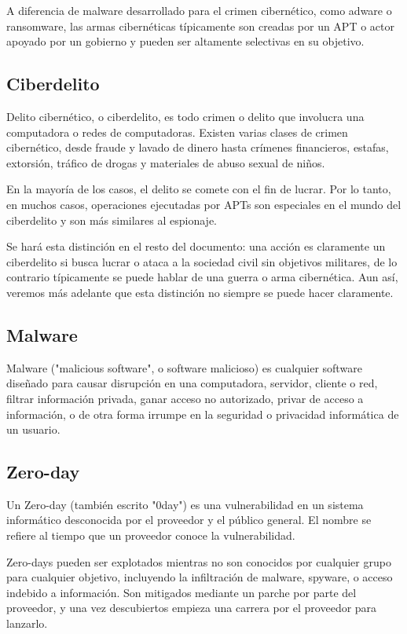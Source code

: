 \documentclass{article}
\begin{document}
A diferencia de malware desarrollado para el crimen cibernético, como adware o ransomware, las armas cibernéticas típicamente son creadas por un APT o actor apoyado por un gobierno y pueden ser altamente selectivas en su objetivo. \autocite{stevens-cyberweapons}

\subsection{Ciberdelito}
Delito cibernético, o ciberdelito, es todo crimen o delito que involucra una computadora o redes de computadoras. Existen varias clases de crimen cibernético, desde fraude y lavado de dinero hasta crímenes financieros, estafas, extorsión, tráfico de drogas y materiales de abuso sexual de niños.

En la mayoría de los casos, el delito se comete con el fin de lucrar. Por lo tanto, en muchos casos, operaciones ejecutadas por APTs son especiales en el mundo del ciberdelito y son más similares al espionaje.

Se hará esta distinción en el resto del documento: una acción es claramente un ciberdelito si busca lucrar o ataca a la sociedad civil sin objetivos militares, de lo contrario típicamente se puede hablar de una guerra o arma cibernética. Aun así, veremos más adelante que esta distinción no siempre se puede hacer claramente. \autocite{cybercrime-britannica}

\subsection{Malware}
Malware ("malicious software", o software malicioso) es cualquier software diseñado para causar disrupción en una computadora, servidor, cliente o red, filtrar información privada, ganar acceso no autorizado, privar de acceso a información, o de otra forma irrumpe en la seguridad o privacidad informática de un usuario. \autocite{tahir-malware}

\subsection{Zero-day}
Un Zero-day (también escrito "0day") es una vulnerabilidad en un sistema informático desconocida por el proveedor y el público general. El nombre se refiere al tiempo que un proveedor conoce la vulnerabilidad.

Zero-days pueden ser explotados mientras no son conocidos por cualquier grupo para cualquier objetivo, incluyendo la infiltración de malware, spyware, o acceso indebido a información. Son mitigados mediante un parche por parte del proveedor, y una vez descubiertos empieza una carrera por el proveedor para lanzarlo. \autocite{symantec-zeroday}
\end{document}
